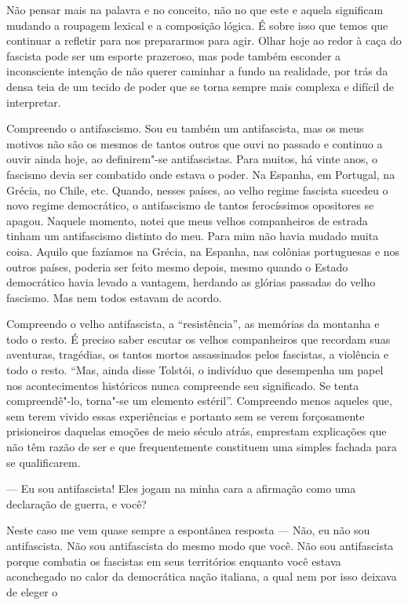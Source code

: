 Não pensar mais na palavra e no conceito, não no que este e aquela
significam mudando a roupagem lexical e a composição lógica. É sobre
isso que temos que continuar a refletir para nos prepararmos para agir.
Olhar hoje ao redor à caça do fascista pode ser um esporte prazeroso,
mas pode também esconder a inconsciente intenção de não querer caminhar
a fundo na realidade, por trás da densa teia de um tecido de poder que
se torna sempre mais complexa e difícil de interpretar.

Compreendo o antifascismo. Sou eu também um antifascista, mas os meus
motivos não são os mesmos de tantos outros que ouvi no passado e
continuo a ouvir ainda hoje, ao definirem"-se antifascistas. Para muitos,
há vinte anos, o fascismo devia ser combatido onde estava o poder. Na
Espanha, em Portugal, na Grécia, no Chile, etc. Quando, nesses países,
ao velho regime fascista sucedeu o novo regime democrático, o
antifascismo de tantos ferocíssimos opositores se apagou. Naquele
momento, notei que meus velhos companheiros de estrada tinham um
antifascismo distinto do meu. Para mim não havia mudado muita coisa.
Aquilo que fazíamos na Grécia, na Espanha, nas colônias portuguesas e
nos outros países, poderia ser feito mesmo depois, mesmo quando o Estado
democrático havia levado a vantagem, herdando as glórias passadas do
velho fascismo. Mas nem todos estavam de acordo.

Compreendo o velho antifascista, a ``resistência'', as memórias da
montanha e todo o resto. É preciso saber escutar os velhos companheiros
que recordam suas aventuras, tragédias, os tantos mortos assassinados
pelos fascistas, a violência e todo o resto. ``Mas, ainda disse Tolstói,
o indivíduo que desempenha um papel nos acontecimentos históricos nunca
compreende seu significado. Se tenta compreendê"-lo, torna"-se um elemento
estéril''. Compreendo menos aqueles que, sem terem vivido essas
experiências e portanto sem se verem forçosamente prisioneiros daquelas
emoções de meio século atrás, emprestam explicações que não têm razão de
ser e que frequentemente constituem uma simples fachada para se
qualificarem.

--- Eu sou antifascista! Eles jogam na minha cara a afirmação como uma
declaração de guerra, e você?

Neste caso me vem quase sempre a espontânea resposta --- Não, eu não sou
antifascista. Não sou antifascista do mesmo modo que você. Não sou
antifascista porque combatia os fascistas em seus territórios enquanto
você estava aconchegado no calor da democrática nação italiana, a qual
nem por isso deixava de eleger o \linebreak

